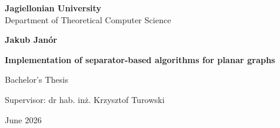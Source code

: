 \begin{titlepage}
  \begin{center}

    \large
    \textbf{Jagiellonian University}\\
    Department of Theoretical Computer Science\\

    \vspace{1.5cm}

    \Large
    \textbf{Jakub Janór}

    \vspace*{2cm}

    \textbf{\LARGE Implementation of separator-based algorithms for planar graphs}

    \vspace{0.5cm}
    \large

    \vfill
    \Large
    Bachelor's Thesis

    \vfill
    \Large
    Supervisor: dr hab. in\.z. Krzysztof Turowski

    \vspace{0.8cm}

    June 2026

  \end{center}
\end{titlepage}
